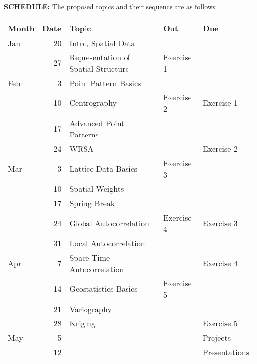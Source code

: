 \documentclass{article} %
\begin{document}
\vspace{.2in}

{\bf SCHEDULE:} 
The proposed topics and their sequence are as follows:
\begin{table}[htbp]
\begin{center}
\begin{tabular}{|lr|l|l|l|}
\hline
Month & \multicolumn{1}{l|}{Date} & Topic & Out & Due \\ \hline
Jan & 20 & Intro, Spatial Data &  &  \\ 
 & 27 & Representation of Spatial Structure & Exercise 1 &  \\ 
Feb & 3 & Point Pattern Basics &  &  \\ 
 & 10 & Centrography & Exercise 2 & Exercise 1 \\ 
 & 17 & Advanced Point Patterns &  & \\ 
 & 24 & WRSA &  & Exercise 2  \\ 
Mar & 3 & Lattice Data Basics & Exercise 3 &  \\ 
 & 10 & Spatial Weights &  &  \\ 
 & 17 & Spring Break &  &  \\ 
 & 24 & Global Autocorrelation & Exercise 4 & Exercise 3 \\ 
 & 31 & Local Autocorrelation &  &  \\ 
Apr & 7 & Space-Time Autocorrelation &  & Exercise 4 \\ 
 & 14 & Geostatistics Basics & Exercise 5 &  \\ 
 & 21 & Variography &  &  \\ 
 & 28 & Kriging &  & Exercise 5 \\ 
May & 5 &  &  & Projects \\ 
 & 12 &  &  & Presentations \\ \hline
\end{tabular}
\end{center}
\end{table}
\end{document}
